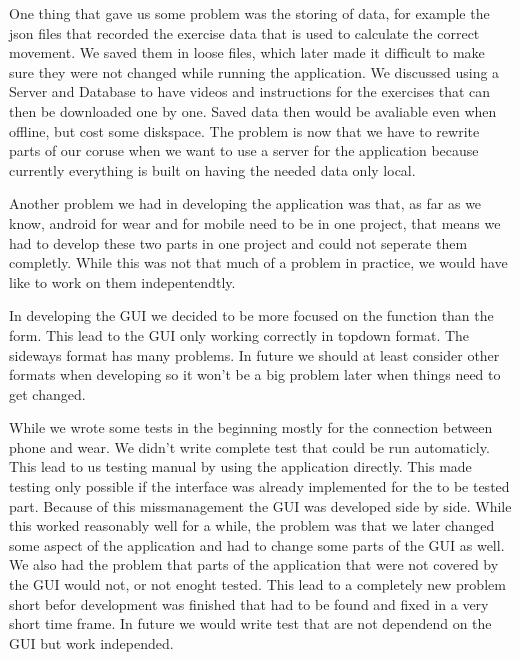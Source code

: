 One thing that gave us some problem was the storing of data, for example the json files that recorded the exercise data that is used to calculate the correct movement. We saved them in loose files, which later made it difficult to make sure they were not changed while running the application. We discussed using a Server and Database to have videos and instructions for the exercises that can then be downloaded one by one. Saved data then would be avaliable even when offline, but cost some diskspace. The problem is now that we have to rewrite parts of our coruse when we want to use a server for the application because currently everything is built on having the needed data only local.

Another problem we had in developing the application was that, as far as we know, android for wear and for mobile need to be in one project, that means we had to develop these two parts in one project and could not seperate them completly. While this was not that much of a problem in practice, we would have like to work on them indepentendtly.

In developing the GUI we decided to be more focused on the function than the form. This lead to the GUI only working correctly in topdown format. The sideways format has many problems. In future we should at least consider other formats when developing so it won't be a big problem later when things need to get changed.


While we wrote some tests in the beginning mostly for the connection between phone and wear. We didn't write complete test that could be run automaticly. This lead to us testing manual by using the application directly. This made testing only possible if the interface was already implemented for the to be tested part. 
Because of this missmanagement the GUI was developed side by side. While this worked reasonably well for a while, the problem was that we later changed some aspect of the application and had to change some parts of the GUI as well.
We also had the problem that parts of the application that were not covered by the GUI would not, or not enoght tested. This lead to a completely new problem short befor development was finished that had to be found and fixed in a very short time frame. 
In future we would write test that are not dependend on the GUI but work independed.
